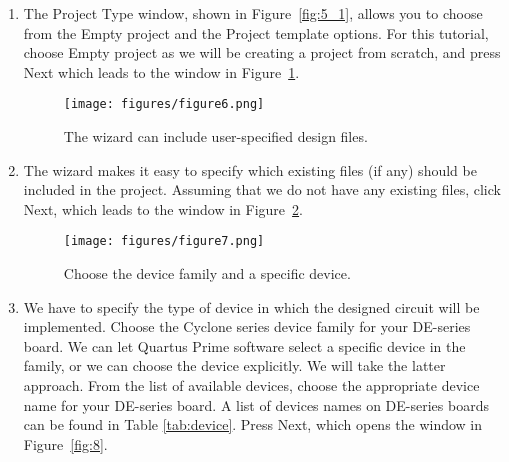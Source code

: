 \begin{enumerate}
\item The {\sf Project Type} window, shown in Figure~\ref{fig:5_1}, allows you to choose from
the {\sf Empty project} and the {\sf Project template} options. For this tutorial, choose {\sf Empty project} 
as we will be creating a project from scratch, and press {\sf Next} which leads to the window in Figure~\ref{fig:6}. 

\begin{figure}[H]
   \begin{center}
      \texttt{[image: figures/figure6.png]}
   \caption{The wizard can include user-specified design files.} 
	 \label{fig:6}
	 \end{center}
\end{figure}

\item The wizard makes it easy to 
specify which existing files (if any) should be included in the project.
Assuming that we do not have any existing files, click {\sf Next}, which leads
to the window in Figure~\ref{fig:7}.

\begin{figure}[H]
   \begin{center}
      \texttt{[image: figures/figure7.png]}
   \caption{Choose the device family and a specific device.} 
	 \label{fig:7}
	 \end{center}
\end{figure}

\item We have to specify the type of device in which the designed circuit will 
be implemented.
Choose the Cyclone\textsuperscript{\textregistered} series device family for your DE-series board. 
We can let Quartus Prime software select a specific device in the family, 
or we can choose the device explicitly. 
We will take the latter approach. 
From the list of available devices, choose the appropriate device name for your DE-series board. A list of devices names on DE-series boards can be found in Table \ref{tab:device}. 
Press {\sf Next}, which opens the window in Figure~\ref{fig:8}.
 

\end{enumerate}
